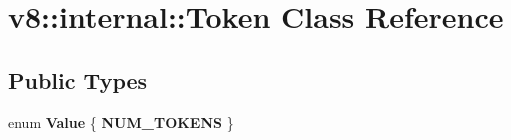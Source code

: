 \hypertarget{classv8_1_1internal_1_1_token}{}\section{v8\+:\+:internal\+:\+:Token Class Reference}
\label{classv8_1_1internal_1_1_token}
\subsection*{Public Types}
\begin{DoxyCompactItemize}
\item 
\hypertarget{classv8_1_1internal_1_1_token_aa1551a1c2dc217193f2f3cd063bc9555}{}enum {\bfseries Value} \{ {\bfseries N\+U\+M\+\_\+\+T\+O\+K\+E\+N\+S}
 \}\label{classv8_1_1internal_1_1_token_aa1551a1c2dc217193f2f3cd063bc9555}

\end{DoxyCompactItemize}
